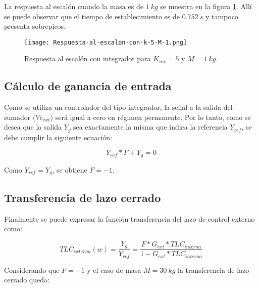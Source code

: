 


 La respuesta al escal\'{o}n cuando la masa es de $1\:kg$ se muestra en la figura \ref{fig:respuesta-al-escalon-con-k-5-M-1}. Allí se puede observar que el tiempo de establecimiento es de $0.752\:s$ y tampoco presenta sobrepicos.



\begin{figure}[H]
	\centering
	\texttt{[image: Respuesta-al-escalon-con-k-5-M-1.png]}
	\caption{Respuesta al escalón con integrador para $K_{int} =5$ y $M=1\:kg$.}
	\label{fig:respuesta-al-escalon-con-k-5-M-1}
\end{figure}

\subsection{Cálculo de ganancia de entrada}

Como se utiliza un controlador del tipo integrador, la señal a la salida del sumador ($Ve_{ext}$) será igual a cero en régimen permanente. Por lo tanto, como se desea que la salida $Y_g$ sea exactamente la misma que indica la referencia $Y_{ref}$, se debe cumplir la siguiente ecuación:

\begin{equation}
	Y_{ref}*F+Y_g=0
\end{equation}

Como $Y_{ref}=Y_g$, se obtiene $F=-1$.

\subsection{Transferencia de lazo cerrado}

Finalmente se puede expresar la función transferencia del lazo de control externo como:

\begin{equation}
	TLC_{externa}(w)=\frac{Y_g}{Y_{ref}}=\frac{F*G_{ext}*TLC_{interna}}{1-G_{ext}*TLC_{interna}}
\end{equation}

Considerando que $F=-1$ y el caso de masa $M=30\:kg$ la transferencia de lazo cerrado queda:

